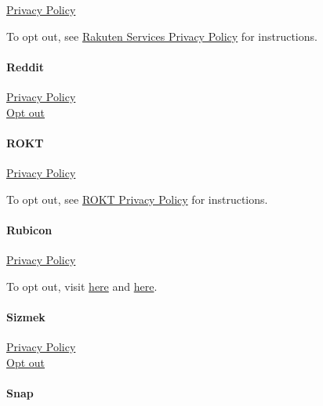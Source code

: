 \href{https://rakutenmarketing.com/legal-notices/services-privacy-policy/}{Privacy
Policy}

To opt out, see
\href{https://rakutenmarketing.com/legal-notices/services-privacy-policy/}{Rakuten
Services Privacy Policy} for instructions.

\hypertarget{reddit}{%
\paragraph{Reddit}\label{reddit}}

\href{https://www.redditinc.com/policies/privacy-policy}{Privacy
Policy}\\
\href{https://www.redditinc.com/policies/privacy-policy\#text-content5}{Opt
out}

\hypertarget{rokt}{%
\paragraph{ROKT}\label{rokt}}

\href{https://rokt.com/privacy-policy/}{Privacy Policy}

To opt out, see \href{https://rokt.com/privacy-policy/}{ROKT Privacy
Policy} for instructions.

\hypertarget{rubicon}{%
\paragraph{Rubicon}\label{rubicon}}

\href{https://rubiconproject.com/rubicon-project-advertising-technology-privacy-policy/}{Privacy
Policy}

To opt out, visit
\href{https://rubiconproject.com/privacy/consumer-online-profile-and-opt-out/}{here}
and \href{http://www.networkadvertising.org/mobile-choice}{here}.

\hypertarget{sizmek}{%
\paragraph{Sizmek}\label{sizmek}}

\href{https://www.sizmek.com/privacy-policy/}{Privacy Policy}\\
\href{https://www.sizmek.com/privacy-policy/optedout/\#options}{Opt out}

\hypertarget{snap}{%
\paragraph{Snap}\label{snap}}

